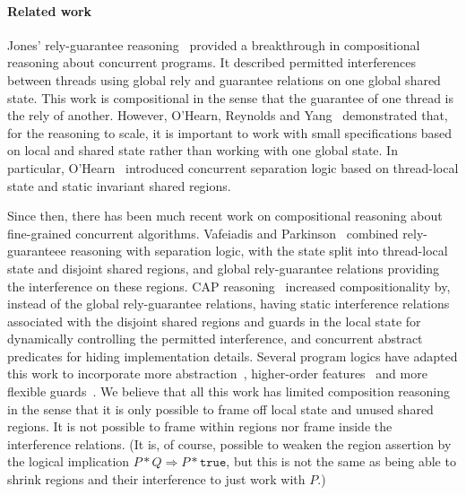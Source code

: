 \paragraph{Related work}

Jones' rely-guarantee reasoning~\cite{rg} provided a breakthrough in
compositional reasoning about concurrent programs. It described
permitted interferences between threads using global rely and
guarantee relations on one  global shared state. This work is
compositional in the sense that the guarantee of one thread is the
rely of another. However, O'Hearn, Reynolds and
Yang~\cite{seplogicsmallaxiomspaper,CSL} demonstrated that, for the
reasoning to scale, it is important to work with small specifications
based on local and shared state rather than working with one
global state. In particular, O'Hearn~\cite{CSL} introduced concurrent
separation logic based on thread-local state and static invariant
shared regions.


Since then, there has been much recent work on compositional
reasoning about fine-grained concurrent algorithms. Vafeiadis and
Parkinson~\cite{RGSep} combined rely-guaranteee reasoning with
separation logic, with the state split into thread-local state and
disjoint shared regions, and global rely-guarantee relations providing
the interference on these regions. 
CAP reasoning~\cite{.} increased  compositionality by, instead of the
global
rely-guarantee relations, having static interference relations
associated with the disjoint shared regions and guards in the local
state for dynamically controlling the permitted  interference, and concurrent
abstract predicates for hiding implementation details. Several
program logics have adapted this work to incorporate more
abstraction~\cite{carosel}, higher-order features~\cite{icap} and more flexible
guards~\cite{tada}. We believe that all  this work has  limited composition
reasoning in the sense that it is only possible to frame off local
state and unused shared regions. It is not possible to 
frame within regions nor frame inside the interference
relations.  (It is, of course, possible to weaken the region assertion
by the logical implication $P * Q \Rightarrow P * \texttt{true}$, but this is
not the same as being able to shrink regions and their interference to
just work with $P$.) 


